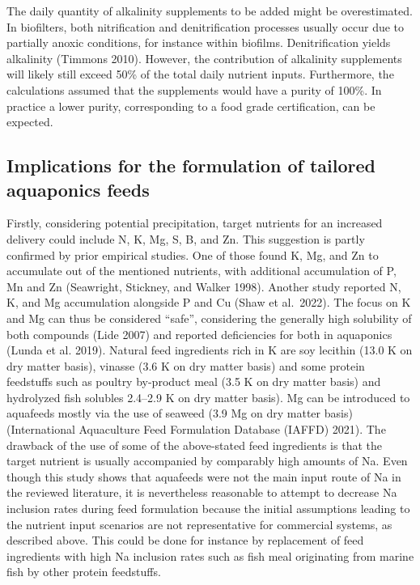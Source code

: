 \documentclass[preprint, 3p,
authoryear]{elsarticle} %
\begin{document}
The daily quantity of alkalinity supplements to be added might be
overestimated. In biofilters, both nitrification and denitrification
processes usually occur due to partially anoxic conditions, for instance
within biofilms. Denitrification yields alkalinity (Timmons 2010).
However, the contribution of alkalinity supplements will likely still
exceed 50\% of the total daily nutrient inputs. Furthermore, the
calculations assumed that the supplements would have a purity of 100\%.
In practice a lower purity, corresponding to a food grade certification,
can be expected.

\hypertarget{implications-for-the-formulation-of-tailored-aquaponics-feeds}{%
\subsection{Implications for the formulation of tailored aquaponics
feeds}\label{implications-for-the-formulation-of-tailored-aquaponics-feeds}}

Firstly, considering potential precipitation, target nutrients for an
increased delivery could include N, K, Mg, S, B, and Zn. This suggestion
is partly confirmed by prior empirical studies. One of those found K,
Mg, and Zn to accumulate out of the mentioned nutrients, with additional
accumulation of P, Mn and Zn (Seawright, Stickney, and Walker 1998).
Another study reported N, K, and Mg accumulation alongside P and Cu
(Shaw et al.~2022). The focus on K and Mg can thus be considered
``safe'', considering the generally high solubility of both compounds
(Lide 2007) and reported deficiencies for both in aquaponics (Lunda et
al. 2019). Natural feed ingredients rich in K are soy lecithin
(\SI{13.0}{\p} K on dry matter basis), vinasse (\SI{3.6}{\p} K on dry
matter basis) and some protein feedstuffs such as poultry by-product
meal (\SI{3.5}{\p} K on dry matter basis) and hydrolyzed fish solubles
\SIrange{2.4}{2.9}{\p} K on dry matter basis). Mg can be introduced to
aquafeeds mostly via the use of seaweed (\SI{3.9}{\p} Mg on dry matter
basis) (International Aquaculture Feed Formulation Database (IAFFD)
2021). The drawback of the use of some of the above-stated feed
ingredients is that the target nutrient is usually accompanied by
comparably high amounts of Na. Even though this study shows that
aquafeeds were not the main input route of Na in the reviewed
literature, it is nevertheless reasonable to attempt to decrease Na
inclusion rates during feed formulation because the initial assumptions
leading to the nutrient input scenarios are not representative for
commercial systems, as described above. This could be done for instance
by replacement of feed ingredients with high Na inclusion rates such as
fish meal originating from marine fish by other protein feedstuffs.
\end{document}
